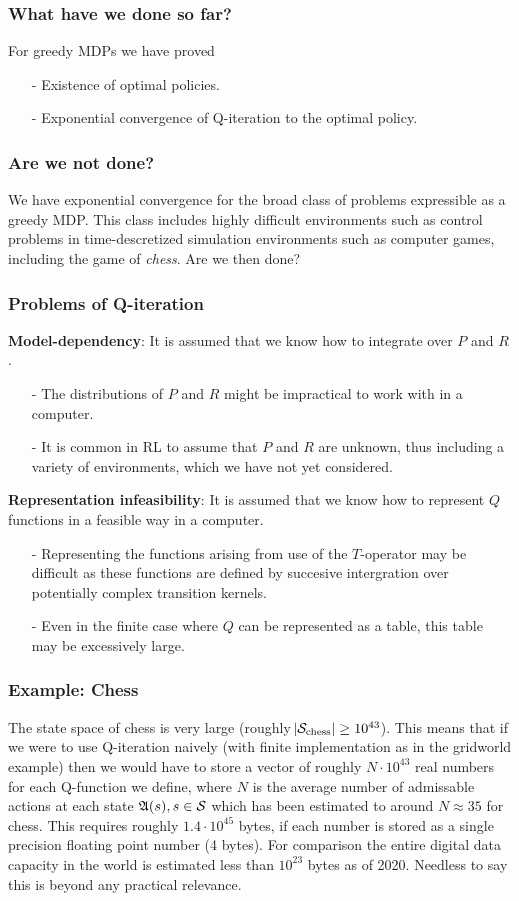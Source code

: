 \documentclass{beamer}[10]
\begin{document}
\begin{frame}
  \frametitle{What have we done so far?}
  For greedy MDPs we have proved
  \begin{itemize}
    \item[-] Existence of optimal policies.
    \item[-] Exponential convergence of Q-iteration to the optimal
      policy.
  \end{itemize}
\end{frame}

\begin{frame}
  \frametitle{Are we not done?}
  We have exponential convergence for the broad class of problems expressible
  as a greedy MDP. This class includes highly difficult environments such as
  control problems in time-descretized simulation environments such as computer
  games, including the game of \emph{chess}. Are we then done?
\end{frame}

\begin{frame}
  \frametitle{Problems of Q-iteration}
  \begingroup
  \footnotesize
  \textbf{Model-dependency}:
  It is assumed that we know how to integrate over $P$ and $R$.
  \begin{itemize}
    \item[-] The distributions of $P$ and $R$ might be impractical to
      work with in a computer.
    \item[-] It is common in RL to assume that $P$ and $R$ are unknown,
      thus including a variety of environments, which we have not yet
      considered.
  \end{itemize}
  \textbf{Representation infeasibility}:
  It is assumed that we know how to represent $Q$ functions in 
  a feasible way in a computer.
  \begin{itemize}
    \item[-] Representing the functions arising from use of the $T$-operator
      may be difficult as these functions are defined by succesive 
      intergration over potentially complex transition kernels.
    \item[-] Even in the finite case where $Q$ can be represented as a table,
      this table may be excessively large.
  \end{itemize}
  \endgroup
\end{frame}


\begin{frame}
  \frametitle{Example: Chess}
  The state space of chess is very large
  (roughly $\abs{\mathcal{S}_{\mathrm{chess}}} \geq 10^{43}$).
  This means that if we were to use Q-iteration naively
  (with finite implementation as in the gridworld example)
  then we would have to store a vector of
  roughly $N \cdot 10^{43}$ real numbers for each Q-function we define,
  where $N$ is the average number of admissable actions at each state
  $\frak{A}(s), s \in \mathcal{S}$
  which has been estimated to around $N \approx 35$ for chess.
  This requires roughly $1.4 \cdot 10^{45}$ bytes, if each number is stored as a
  single precision floating point number (4 bytes).
  For comparison the entire digital data capacity in the world is estimated
  less than $10^{23}$ bytes as of 2020.
  Needless to say this is beyond any practical relevance.
\end{frame}
\end{document}
